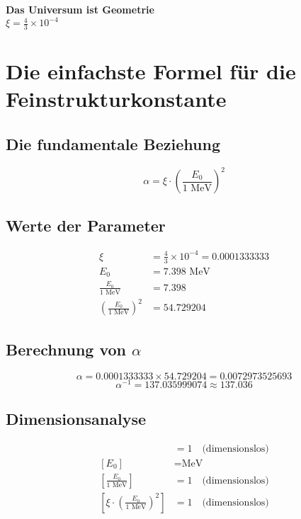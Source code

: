 \documentclass[12pt,a4paper]{article}
\theoremstyle{definition}
\begin{document}
	\begin{center}
		\Large
		\textbf{Das Universum ist Geometrie}\\
		\vspace{1cm}
		\huge
		$\boxed{\xi = \frac{4}{3} \times 10^{-4}}$
	\end{center}
	
	\section*{Die einfachste Formel für die Feinstrukturkonstante}
	
	\subsection*{Die fundamentale Beziehung}
	
	\[
	\boxed{\alpha = \xi \cdot \left(\frac{E_0}{1 \text{ MeV}}\right)^2}
	\]
	
	\subsection*{Werte der Parameter}
	
	\begin{align*}
		\xi &= \frac{4}{3} \times 10^{-4} = 0.0001333333 \\
		E_0 &= 7.398 \text{ MeV} \\
		\frac{E_0}{1 \text{ MeV}} &= 7.398 \\
		\left(\frac{E_0}{1 \text{ MeV}}\right)^2 &= 54.729204
	\end{align*}
	
	\subsection*{Berechnung von $\alpha$}
	
	\[
	\alpha = 0.0001333333 \times 54.729204 = 0.0072973525693
	\]
	\[
	\alpha^{-1} = 137.035999074 \approx 137.036
	\]
	
	\subsection*{Dimensionsanalyse}
	
	\begin{align*}
		[\xi] &= 1 \quad \text{(dimensionslos)} \\
		[E_0] &= \text{MeV} \\
		\left[\frac{E_0}{1 \text{ MeV}}\right] &= 1 \quad \text{(dimensionslos)} \\
		\left[\xi \cdot \left(\frac{E_0}{1 \text{ MeV}}\right)^2\right] &= 1 \quad \text{(dimensionslos)}
	\end{align*}
	
\end{document}
